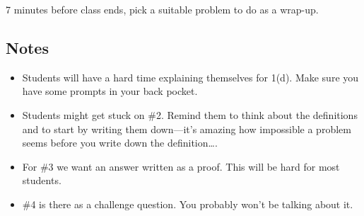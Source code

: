 \documentclass[red]{tutorial}
\theoremstyle{definition}
\theoremstyle{theorem}
\begin{document}
\begin{instructions}
		7 minutes before class ends, pick a suitable problem to do as a wrap-up. 



	
\subsection*{Notes}
	\begin{itemize}
		\item Students will have a hard time explaining themselves for 1(d). Make sure you
			have some prompts in your back pocket.
		\item Students might get stuck on \#2. Remind them to think about the definitions and
			to start by writing them down---it's amazing how impossible a problem seems before
			you write down the definition\ldots.
		\item For \#3 we want an answer written as a proof. This will be hard for most students.
		\item \#4 is there as a challenge question. You probably won't be talking about it.

	\end{itemize}
	\end{instructions}
\end{document}
